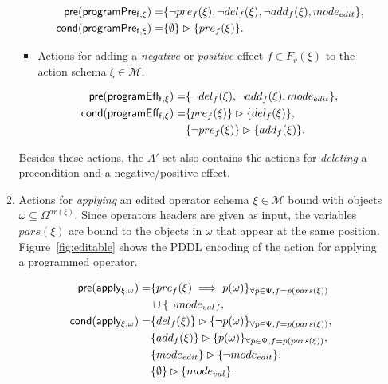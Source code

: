 \documentclass[letterpaper]{article} %
\newcommand{\pre}{\mathsf{pre}}     %
\newcommand{\cond}{\mathsf{cond}}   %
\begin{document}
\begin{itemize}
\begin{enumerate}
\begin{itemize}
\begin{small}
\begin{align*}
\hspace*{7pt}\pre(\mathsf{programPre_{f,\xi}})=&\{\neg pre_{f}(\xi), \neg del_{f}(\xi),\neg add_{f}(\xi), mode_{edit}\},\\
\cond(\mathsf{programPre_{f,\xi}})=&\{\emptyset\}\rhd\{pre_{f}(\xi)\}.
\end{align*}
\end{small}

\item Actions for adding a {\em negative} or {\em positive} effect $f\in F_v(\xi)$ to the action schema $\xi\in\mathcal{M}$.

\begin{small}
\begin{align*}
\hspace*{7pt}\pre(\mathsf{programEff_{f,\xi}})=&\{\neg del_{f}(\xi),\neg add_{f}(\xi), mode_{edit}\},\\
\cond(\mathsf{programEff_{f,\xi}})=&\{pre_{f}(\xi)\}\rhd\{del_{f}(\xi)\},\\
&\{\neg pre_{f}(\xi)\}\rhd\{add_{f}(\xi)\}.
\end{align*}
\end{small}
\end{itemize}
Besides these actions, the $A'$ set also contains the actions for {\em deleting} a precondition and a negative/positive effect.


\item Actions for {\em applying} an edited operator schema $\xi\in\mathcal{M}$ bound with objects $\omega\subseteq\Omega^{ar(\xi)}$. Since operators headers are given as input, the variables $pars(\xi)$ are bound to the objects in $\omega$ that appear at the same position. Figure~\ref{fig:editable} shows the PDDL encoding of the action for applying a programmed operator.
\begin{small}
\begin{align*}
\hspace*{7pt}\pre(\mathsf{apply_{\xi,\omega}})=&\{pre_{f}(\xi)\implies p(\omega)\}_{\forall p\in\Psi,f=p(pars(\xi))}\\
&\cup \{\neg mode_{val}\},\\
\cond(\mathsf{apply_{\xi,\omega}})=&\{del_{f}(\xi)\}\rhd\{\neg p(\omega)\}_{\forall p\in\Psi,f=p(pars(\xi))},\\
&\{add_{f}(\xi)\}\rhd\{p(\omega)\}_{\forall p\in\Psi,f=p(pars(\xi))},\\
&\{mode_{edit}\}\rhd\{\neg mode_{edit}\},\\
&\{\emptyset\}\rhd\{mode_{val}\}.
\end{align*}
\end{small}


\end{enumerate}
\end{itemize}
\end{document}
